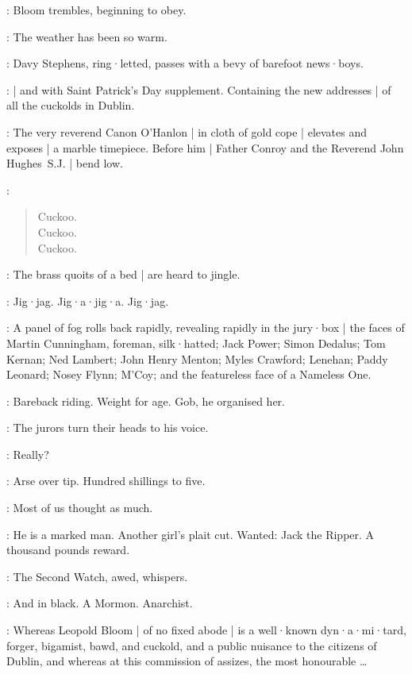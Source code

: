 :
Bloom trembles,
beginning to obey.

\Bloom:
The weather has been so warm.

:
Davy Stephens,
ring·letted,
passes with a bevy of barefoot news·boys.

\DavyStephens:
 |
and 
with Saint Patrick's Day supplement.
Containing the new addresses |
of all the cuckolds in Dublin.

:
The very reverend Canon O'Hanlon |
in cloth of gold cope |
elevates and exposes |
a marble timepiece.
Before him |
Father Conroy and the Reverend John Hughes~S.J. |
bend low.%

\Timepiece:
\begin{verse}
    Cuckoo.\\
    Cuckoo.\\
    Cuckoo.
\end{verse}

:
The brass quoits of a bed |
are heard to jingle.

\Quoits:
Jig·jag.
Jig·a·jig·a.
Jig·jag.

:
A panel of fog rolls back rapidly,
revealing rapidly in the jury·box |
the faces of Martin Cunningham,
foreman,
silk·hatted;
Jack Power;
Simon Dedalus;
Tom Kernan;
Ned Lambert;
John Henry Menton;
Myles Crawford;
Lenehan;
Paddy Leonard;
Nosey Flynn;
M'Coy;
and the featureless face of a Nameless One.

\NamelessOne:
Bareback riding.
Weight for age.
Gob,
he organised her.

:
The jurors turn their heads to his voice.

\Jurors:
Really?

\NamelessOne:
Arse over tip.
Hundred shillings to five.

\Jurors:
Most of us thought as much.

\FirstWatch[1]:
He is a marked man.
Another girl's plait cut.
Wanted:
Jack the Ripper.
A thousand pounds reward.

:
The Second Watch,
awed,
whispers.

\SecondWatch:
And in black.
A Mormon.
Anarchist.

\Crier:
Whereas Leopold Bloom |
of no fixed abode |
is a well·known dyn·a·mi·tard,
forger,
bigamist,
bawd,
and cuckold,
and a public nuisance to the citizens of Dublin,
and whereas at this commission of assizes,
the most honourable \ldots

